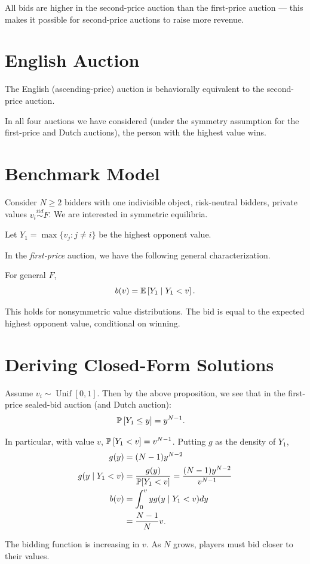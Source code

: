 \begin{remark}	All bids are higher in the second-price auction than the first-price auction --- this makes it possible for second-price auctions to raise more revenue.
\end{remark}

\section{English Auction}

The English (ascending-price) auction is behaviorally equivalent to the second-price auction.

\begin{remark}	In all four auctions we have considered (under the symmetry assumption for the first-price and Dutch auctions), the person with the highest value wins.
\end{remark}

\section{Benchmark Model}
Consider $N \ge 2$ bidders with one indivisible object, risk-neutral bidders, private values $v_i \overset{iid}{\sim} F$. We are interested in symmetric equilibria. 

Let $Y_1 = \max \{v_j : j \ne i\}$ be the highest opponent value. 

In the \emph{first-price} auction, we have the following general characterization.

\begin{proposition}
	For general $F$, \[
		b(v) = \E\left[Y_1 \mid Y_1 < v\right] 	.\]
\end{proposition}

This holds for nonsymmetric value distributions.
The bid is equal to the expected highest opponent value, conditional on winning.

\section{Deriving Closed-Form Solutions}

Assume $v_i \sim \operatorname{Unif}[0,1]$. Then by the above proposition, we see that in the first-price sealed-bid auction (and Dutch auction):
\begin{align*}
	\P\left[Y_1 \le y\right] &= y^{N-1}.
\end{align*}

In particular, with value $v$, $\P\left[Y_1 < v\right]  = v^{N-1}$.
Putting $g$ as the density of $Y_1$,
\begin{align*}
	g(y) &= (N-1) y ^{N-2} \\
	g(y \mid Y_1 < v) &= \frac{g(y)}{\P[Y_1 < v]} = \frac{(N-1) y^{N-2}}{v^{N-1}} \\
	b(v) &= \int_{0}^{v} y g(y \mid Y_1 < v) dy   \\
	&= \frac{N-1}{N}v
.\end{align*}

The bidding function is increasing in $v$. As $N$ grows, players must bid closer to their values.
